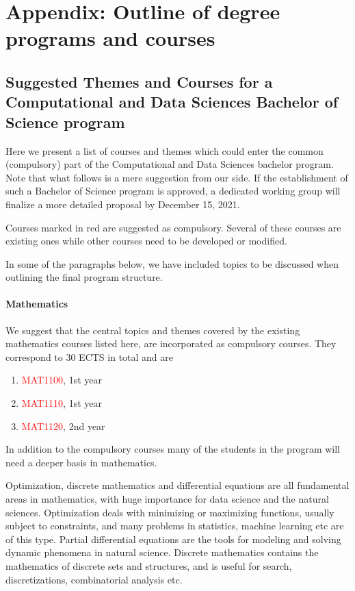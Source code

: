\documentclass[oneside,final,10pt]{article}
\begin{document}
\section*{Appendix:  Outline of degree programs and courses}

\subsection*{Suggested Themes and Courses for a Computational and Data Sciences  Bachelor of Science program}

Here we present a list of courses and themes which could enter the common (compulsory) part of the Computational and Data Sciences  bachelor program.  Note that what follows is a mere suggestion from our side. If the establishment of such a Bachelor of Science program is approved, a dedicated working group will finalize a more detailed proposal by December 15, 2021.

Courses marked in red are suggested as compulsory.
Several of these courses are existing ones while other courses need to be developed or modified. 

In some of the paragraphs below, we have included topics to be discussed when outlining the final program structure. 

\paragraph{Mathematics}
We suggest that the central topics and themes covered by the existing mathematics courses listed here, are incorporated as compulsory courses. They correspond to 
30 ECTS in total and are
\begin{enumerate}
\color{red}
    \item \textcolor{red}{MAT1100}, 1st year
    \item \textcolor{red}{MAT1110}, 1st year
    \item \textcolor{red}{MAT1120}, 2nd year
\end{enumerate}

In addition to the compulsory courses many of the students in the program will need a deeper basis in mathematics. 

Optimization, discrete mathematics  and differential equations  are all fundamental areas in mathematics, with huge importance for data science and the natural sciences. Optimization deals with minimizing or maximizing functions, usually subject to constraints, and many problems in statistics, machine learning etc are of this type. Partial differential equations are the tools for modeling and solving dynamic phenomena in natural science. Discrete mathematics contains the mathematics of discrete sets and structures, and is useful for search, discretizations, combinatorial analysis etc.
\end{document}
